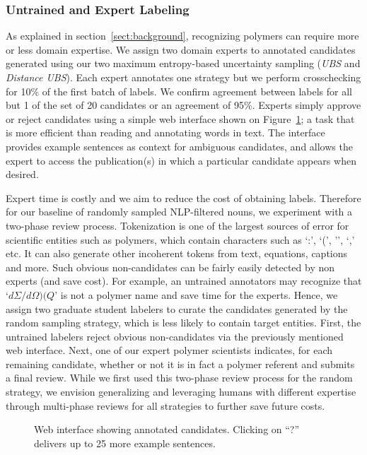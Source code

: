 \subsubsection{Untrained and Expert Labeling}
As explained in section~\ref{sect:background}, recognizing polymers can require more or less domain expertise.
We assign two domain experts to annotated candidates generated using our two maximum entropy-based uncertainty sampling (\textit{UBS} and \textit{Distance UBS}). 
Each expert annotates one strategy but we perform crosschecking for 10\% of the first batch of labels. We confirm agreement between labels for all but 1 of the set of 20 candidates or an agreement of 95\%.
Experts simply approve or reject candidates using a simple web interface shown on Figure~\ref{fig:polyner}; a task that is more efficient than reading and annotating words in text.
The interface
provides example sentences as context for ambiguous candidates,
and allows the expert to access the publication(s) in which a particular candidate
appears when desired.

Expert time is costly and we aim to reduce the cost of obtaining labels.
Therefore for our baseline of randomly sampled NLP-filtered nouns, we experiment with a two-phase review process.
Tokenization is one of the largest sources of error for scientific entities such as polymers, which contain characters such as `:', `(',
'\textendash', `,' etc. It can also generate other incoherent tokens from text, equations, captions and more.
Such obvious non-candidates can be fairly easily detected by non experts (and save cost).
For example, an untrained annotators may recognize that `$d\Sigma/d\Omega)(Q$' is not a polymer name and save time for the experts.
Hence, we assign two graduate student labelers to curate the candidates generated by the random sampling strategy, which is less likely to contain target entities.
First, the untrained labelers reject obvious non-candidates via the previously mentioned web interface. 
Next, one of our expert polymer scientists indicates, for each remaining
candidate, whether or not it is in fact a polymer referent and submits a final review.
While we first used this two-phase review process for the random strategy, we envision generalizing and leveraging humans with different expertise through multi-phase reviews for all strategies to further save future costs.


\begin{figure}
\centering
{}
\caption{\label{fig:polyner} Web interface showing annotated candidates.
Clicking on ``?'' delivers up to 25 more example sentences.
}
\end{figure}

